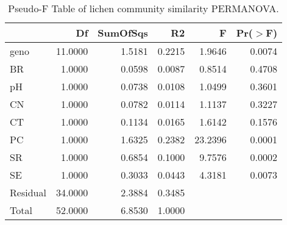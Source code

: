 \begin{table}[ht]
\centering
\begin{tabular}{lrrrrr}
  \hline
 & Df & SumOfSqs & R2 & F & Pr($>$F) \\ 
  \hline
geno & 11.0000 & 1.5181 & 0.2215 & 1.9646 & 0.0074 \\ 
  BR & 1.0000 & 0.0598 & 0.0087 & 0.8514 & 0.4708 \\ 
  pH & 1.0000 & 0.0738 & 0.0108 & 1.0499 & 0.3601 \\ 
  CN & 1.0000 & 0.0782 & 0.0114 & 1.1137 & 0.3227 \\ 
  CT & 1.0000 & 0.1134 & 0.0165 & 1.6142 & 0.1576 \\ 
  PC & 1.0000 & 1.6325 & 0.2382 & 23.2396 & 0.0001 \\ 
  SR & 1.0000 & 0.6854 & 0.1000 & 9.7576 & 0.0002 \\ 
  SE & 1.0000 & 0.3033 & 0.0443 & 4.3181 & 0.0073 \\ 
  Residual & 34.0000 & 2.3884 & 0.3485 &  &  \\ 
  Total & 52.0000 & 6.8530 & 1.0000 &  &  \\ 
   \hline
\end{tabular}
\caption{Pseudo-F Table of lichen community similarity PERMANOVA.} 
\label{tab:com_perm}
\end{table}
